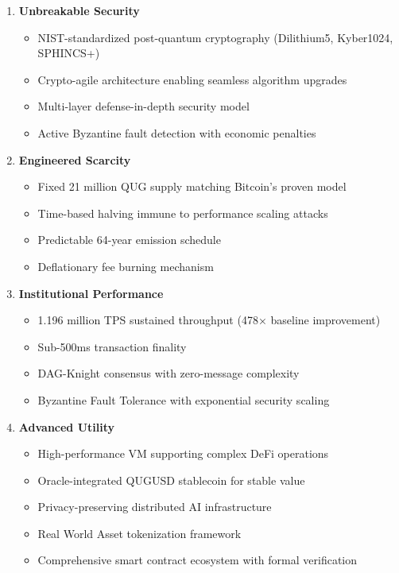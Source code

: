 \documentclass[11pt,a4paper]{scrartcl}
\begin{document}
\begin{enumerate}
\item \textbf{Unbreakable Security}
   \begin{itemize}
   \item NIST-standardized post-quantum cryptography (Dilithium5, Kyber1024, SPHINCS+)
   \item Crypto-agile architecture enabling seamless algorithm upgrades
   \item Multi-layer defense-in-depth security model
   \item Active Byzantine fault detection with economic penalties
   \end{itemize}

\item \textbf{Engineered Scarcity}
   \begin{itemize}
   \item Fixed 21 million QUG supply matching Bitcoin's proven model
   \item Time-based halving immune to performance scaling attacks
   \item Predictable 64-year emission schedule
   \item Deflationary fee burning mechanism
   \end{itemize}

\item \textbf{Institutional Performance}
   \begin{itemize}
   \item 1.196 million TPS sustained throughput (478× baseline improvement)
   \item Sub-500ms transaction finality
   \item DAG-Knight consensus with zero-message complexity
   \item Byzantine Fault Tolerance with exponential security scaling
   \end{itemize}

\item \textbf{Advanced Utility}
   \begin{itemize}
   \item High-performance VM supporting complex DeFi operations
   \item Oracle-integrated QUGUSD stablecoin for stable value
   \item Privacy-preserving distributed AI infrastructure
   \item Real World Asset tokenization framework
   \item Comprehensive smart contract ecosystem with formal verification
   \end{itemize}
\end{enumerate}
\end{document}
